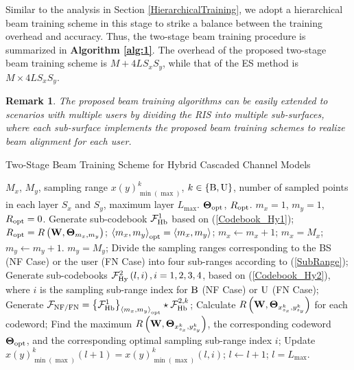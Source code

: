 \documentclass[lettersize, journal]{IEEEtran}
\newtheorem{myRemark}{Remark}
\begin{document}
Similar to the analysis in Section {\ref{HierarchicalTraining}}, we adopt a hierarchical beam training scheme in this stage to strike a balance between the training overhead and accuracy. 
Thus, the two-stage beam training procedure is summarized in {\bf{Algorithm {\ref{alg:1}}}}.
The overhead of the proposed two-stage beam training scheme is $M+4L{S_x}{S_y} $, while that of the ES method is $M \times 4L{S_x}{S_y}$.


\begin{myRemark} \label{Remark_MultiUser}
The proposed beam training algorithms can be easily extended to scenarios with multiple users by dividing the RIS into multiple sub-surfaces, where each sub-surface implements the proposed beam training schemes to realize beam alignment for each user.
\end{myRemark}


\begin{algorithm}[!t]
\caption{ Two-Stage Beam Training Scheme for Hybrid Cascaded Channel Models }
\label{alg:1}
\begin{algorithmic}[1]
\REQUIRE $M_x$, $M_y$, sampling range $x(y)^{k}_{\min(\max)}$, $ k \in \left\{ {\rm{B}}, {\rm{U}}\right\} $, number of sampled points in each layer $S_x $ and $S_y $, maximum layer $L_{\max}$.
\ENSURE ${\bf{\Theta }}_{\rm{opt}}$, $R_{\rm{opt}}$.
 $m_x=1$, $m_y=1$, $ R_{\rm{opt}} = 0 $.
\STATE Generate sub-codebook ${\cal{F}}_{\rm{Hb}}^1$ based on ({\ref{Codebook_Hy1}});
\REPEAT
\REPEAT
{}
\STATE $R_{\rm{opt}} = R \left( {\bf{W}}, {\bf{\Theta }}_{{m_x, m_y }} \right)$;
\STATE $\left \langle m_x, m_y \right \rangle_{\rm{opt}} = \left \langle { {m_x}, {m_y} } \right \rangle$;
\ENDIF
\STATE $m_x \leftarrow m_x + 1$;
\UNTIL $m_x = M_x$;
\STATE $m_y \leftarrow m_y + 1$.
\UNTIL $m_y = M_y$;
\REPEAT
\STATE Divide the sampling ranges corresponding to the BS (NF Case) or the user (FN Case) into four sub-ranges according to (\ref{SubRange});
\STATE Generate sub-codebooks ${\cal{F}}_{\rm{Hy}}^2 \left( l, i \right), i =1,2,3,4$, based on ({\ref{Codebook_Hy2}}), where $i$ is the sampling sub-range index for ${\rm{B}}$ (NF Case) or ${\rm{U}}$ (FN Case);
\STATE Generate ${\cal{F}}_{{\rm{NF}}/{\rm{FN}}} = {\left\{ {\cal{F}}_{\rm{Hb}}^1\right\}} _{\left \langle m_x, m_y \right \rangle_{\rm{opt}}} \star {\cal{F}}_{\rm{Hb}}^{2, k}$;
\STATE Calculate $R \left( {\bf{W}}, {\bf{\Theta }}_{x_{s_x}^k, y_{s_y}^k} \right)$ for each codeword;
\STATE Find the maximum $R \left( {\bf{W}}, {\bf{\Theta }}_{x_{s_x}^k, y_{s_y}^k} \right)$, the corresponding codeword ${\bf{\Theta }}_{\rm{opt}}$, and the corresponding optimal sampling sub-range index $ i $;
\STATE Update $x(y)^{k}_{\min(\max)}\left( l+1 \right) = x(y)^{k}_{\min(\max)} \left( l, i \right)$;
\STATE $l \leftarrow l + 1$; 
\UNTIL $l = L_{\max}$.
\end{algorithmic}
\end{algorithm}
\end{document}
